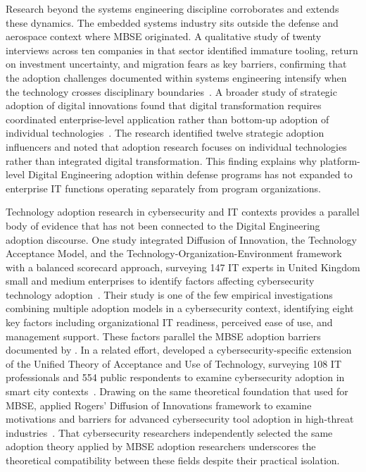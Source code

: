 Research beyond the systems engineering discipline corroborates and extends these dynamics. The embedded systems industry sits outside the defense and aerospace context where MBSE originated. A qualitative study of twenty interviews across ten companies in that sector identified immature tooling, return on investment uncertainty, and migration fears as key barriers, confirming that the adoption challenges documented within systems engineering intensify when the technology crosses disciplinary boundaries~\parencite{Vogelsang_2017}. A broader study of strategic adoption of digital innovations found that digital transformation requires coordinated enterprise-level application rather than bottom-up adoption of individual technologies~\parencite{Campagna_2024}. The research identified twelve strategic adoption influencers and noted that adoption research focuses on individual technologies rather than integrated digital transformation. This finding explains why platform-level Digital Engineering adoption within defense programs has not expanded to enterprise IT functions operating separately from program organizations.

Technology adoption research in cybersecurity and IT contexts provides a parallel body of evidence that has not been connected to the Digital Engineering adoption discourse. One study integrated Diffusion of Innovation, the Technology Acceptance Model, and the Technology-Organization-Environment framework with a balanced scorecard approach, surveying 147 IT experts in United Kingdom small and medium enterprises to identify factors affecting cybersecurity technology adoption~\parencite{Hasani_2023}. Their study is one of the few empirical investigations combining multiple adoption models in a cybersecurity context, identifying eight key factors including organizational IT readiness, perceived ease of use, and management support. These factors parallel the MBSE adoption barriers documented by \citeauthor{Henderson_McDermott_Salado_2024}. In a related effort, \citeauthor{Alghamdi_2023} developed a cybersecurity-specific extension of the Unified Theory of Acceptance and Use of Technology, surveying 108 IT professionals and 554 public respondents to examine cybersecurity adoption in smart city contexts~\parencite{Alghamdi_2023}. Drawing on the same theoretical foundation that \citeauthor{Call_2024} used for MBSE, \citeauthor{Anthony_2024} applied Rogers' Diffusion of Innovations framework to examine motivations and barriers for advanced cybersecurity tool adoption in high-threat industries~\parencite{Anthony_2024}. That cybersecurity researchers independently selected the same adoption theory applied by MBSE adoption researchers underscores the theoretical compatibility between these fields despite their practical isolation.

